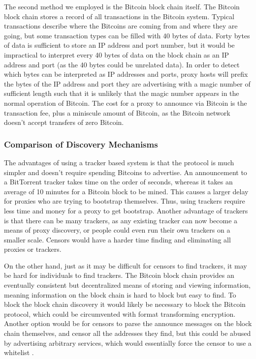 The second method we employed is the Bitcoin block chain itself. The Bitcoin block chain stores a record of all transactions in the Bitcoin system. Typical transactions describe where the Bitcoins are coming from and where they are going, but some transaction types can be filled with 40 bytes of data. Forty bytes of data is sufficient to store an IP address and port number, but it would be impractical to interpret every 40 bytes of data on the block chain as an IP address and port (as the 40 bytes could be unrelated data). In order to detect which bytes can be interpreted as IP addresses and ports, proxy hosts will prefix the bytes of the IP address and port they are advertising with a magic number of sufficient length such that it is unlikely that the magic number appears in the normal operation of Bitcoin. The cost for a proxy to announce via Bitcoin is the transaction fee, plus a miniscule amount of Bitcoin, as the Bitcoin network doesn't accept transfers of zero Bitcoin.

\subsubsection{Comparison of Discovery Mechanisms}
The advantages of using a tracker based system is that the protocol is much simpler and doesn't require spending Bitcoins to advertise. An announcement to a BitTorrent tracker takes time on the order of seconds, whereas it takes an average of 10 minutes for a Bitcoin block to be mined. This causes a larger delay for proxies who are trying to bootstrap themselves. Thus, using trackers require less time and money for a proxy to get bootstrap. Another advantage of trackers is that there can be many trackers, as any existing tracker can now become a means of proxy discovery, or people could even run their own trackers on a smaller scale. Censors would have a harder time finding and eliminating all proxies or trackers.

On the other hand, just as it may be difficult for censors to find trackers, it may be hard for individuals to find trackers. The Bitcoin block chain provides an eventually consistent but decentralized means of storing and viewing information, meaning information on the block chain is hard to block but easy to find. To block the block chain discovery it would likely be necessary to block the Bitcoin protocol, which could be circumvented with format transforming encryption. Another option would be for censors to parse the announce messages on the block chain themselves, and censor all the addresses they find, but this could be abused by advertising arbitrary services, which would essentially force the censor to use a whitelist
.


